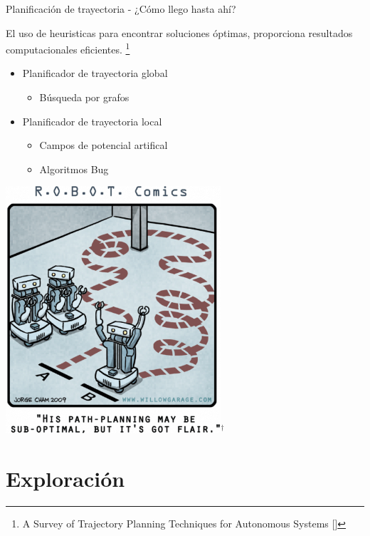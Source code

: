 \documentclass[
  24pt, %
  aspectratio=169, %
]{beamer}
\begin{document}
\begin{frame}{Planificación de trayectoria - ¿Cómo llego hasta ahí?}
  \begin{minipage}{0.57\textwidth}

    El uso de heuristicas para encontrar soluciones óptimas, proporciona resultados computacionales eficientes. \footnote{A Survey of Trajectory Planning Techniques for Autonomous Systems [\cite{Mir2022}]} 
    \bigskip %
    \begin{itemize}
    \item Planificador de trayectoria global
      \begin{itemize}
      \item Búsqueda por grafos
      \end{itemize}
      \bigskip %
    \item Planificador de trayectoria local
      \begin{itemize}
      \item Campos de potencial artifical
      \item Algoritmos Bug
      \end{itemize}
    \end{itemize}
    \bigskip %
  \end{minipage}
  \hspace{0.2cm}
  \begin{minipage}{0.4\textwidth}
    \includegraphics[width=0.6\textwidth]{img5}$^\dag$\\
  \end{minipage}
\end{frame}

\section{Exploración}
\end{document}
